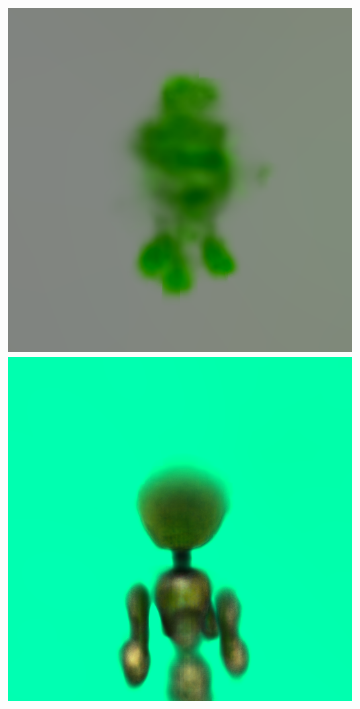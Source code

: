 \begin{figure}[ht]
\begin{subfigure}[b]{0.20\textwidth}
        \caption{}
    \end{subfigure}
    \begin{subfigure}[b]{0.20\textwidth}
        \centering
        \includegraphics[width=\textwidth]{figures/appendix/dreamfusion_plantrobot_1_part1.png}
        \includegraphics[width=\textwidth]{figures/appendix/dreamfusion_plantrobot_5000_part1.png}

\end{subfigure}
\end{figure}
